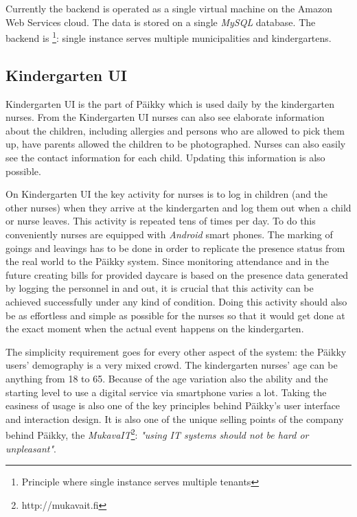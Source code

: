 Currently the backend is operated as a single virtual machine on the Amazon Web Services cloud. The data is stored on a single \textit{MySQL} database. The backend is \footnote{Principle where single instance serves multiple tenants}: single instance serves multiple municipalities and kindergartens. 






\subsection{Kindergarten UI}

Kindergarten UI is the part of Päikky which is used daily by the kindergarten nurses. From the Kindergarten UI nurses can also see elaborate information about the children, including allergies and persons who are allowed to pick them up, have parents allowed the children to be photographed. Nurses can also easily see the contact information for each child. Updating this information is also possible. %

On Kindergarten UI the key activity for nurses is to log in children (and the other nurses) when they arrive at the kindergarten and log them out when a child or nurse leaves. This activity is repeated tens of times per day. To do this conveniently nurses are equipped with \textit{Android} smart phones. The marking of goings and leavings has to be done in order to replicate the presence status from the real world to the Päikky system. Since monitoring attendance and in the future creating bills for provided daycare is based on the presence data generated by logging the personnel in and out, it is crucial that this activity can be achieved successfully under any kind of condition. Doing this activity should also be as effortless and simple as possible for the nurses so that it would get done at the exact moment when the actual event happens on the kindergarten. 

The simplicity requirement goes for every other aspect of the system: the Päikky users' demography is a very mixed crowd. The kindergarten nurses' age can be anything from 18 to 65. Because of the age variation also the ability and the starting level to use a digital service via smartphone varies a lot. Taking the easiness of usage is also one of the key principles behind Päikky's user interface and interaction design. It is also one of the unique selling points of the company behind Päikky, the \textit{MukavaIT}\footnote{http://mukavait.fi}: \textit{"using IT systems should not be hard or unpleasant"}.

